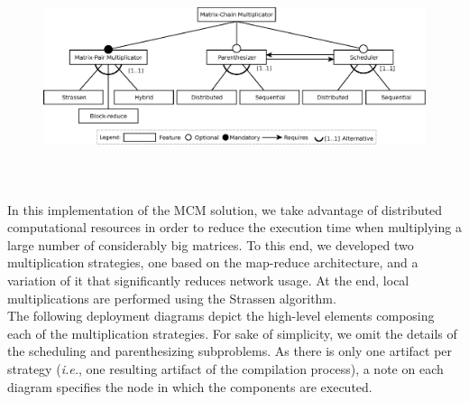 \documentclass{article}
\begin{document}
\begin{figure}[H]
	\centering
	\includegraphics[width=5.5in,height=2.5in]{fig/evaluation/features-diagram}
\end{figure}

In this implementation of the MCM solution, we take advantage of distributed computational resources in order to reduce the execution time when multiplying a large number of considerably big matrices. To this end, we developed two multiplication strategies, one based on the map-reduce architecture, and a variation of it that significantly reduces network usage. At the end, local multiplications are performed using the Strassen algorithm. \\

The following deployment diagrams depict the high-level elements composing each of the multiplication strategies. For sake of simplicity, we omit the details of the scheduling and parenthesizing subproblems. As there is only one artifact per strategy (\textit{i.e.}, one resulting artifact of the compilation process), a note on each diagram specifies the node in which the components are executed. \\
\end{document}
